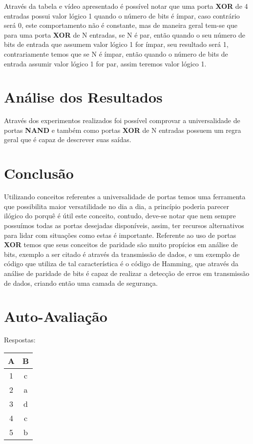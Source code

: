 \documentclass[12pt]{article}
\begin{document}
Através da tabela e vídeo apresentado é possível notar que uma porta \textbf{XOR} de 4 entradas possui valor lógico 1 quando o número de bits é ímpar, caso contrário será 0, este comportamento não é constante, mas de maneira geral tem-se que para uma porta \textbf{XOR} de N entradas, se N é par, então quando o seu número de bits de entrada que assumem valor lógico 1 for ímpar, seu resultado será 1, contrariamente temos que se N é ímpar, então quando o número de bits de entrada assumir valor lógico 1 for par, assim teremos valor lógico 1.

\section{Análise dos Resultados}
\label{sec:Resultados}

Através dos experimentos realizados foi possível comprovar a universalidade de portas \textbf{NAND} e também como portas \textbf{XOR} de N entradas possuem um regra geral que é capaz de descrever suas saídas.

\section{Conclusão}
\label{sec:Conclusao}

Utilizando conceitos referentes a universalidade de portas temos uma ferramenta que possibilita maior versatilidade no dia a dia, a princípio poderia parecer ilógico do porquê é útil este conceito, contudo, deve-se notar que nem sempre possuímos todas as portas desejadas disponíveis, assim, ter recursos alternativos para lidar com situações como estas é importante.
Referente ao uso de portas \textbf{XOR} temos que seus conceitos de paridade são muito propícios em análise de bits, exemplo a ser citado é através da transmissão de dados, e um exemplo de código que utiliza de tal característica é o código de Hamming, que através da análise de paridade de bits é capaz de realizar a detecção de erros em transmissão de dados, criando então uma camada de segurança.

\nocite{*}



\newpage
\section*{Auto-Avaliação}

Respostas:

\begin{table}[H]
    \begin{tabular}{|c|c|} \hline
    \textbf{A} & \textbf{B}\\
    \hline
    1 & c \\ \hline
    2 & a \\ \hline
    3 & d \\ \hline
    4 & c \\ \hline
    5 & b \\ \hline
    \end{tabular}
\end{table}
\end{document}
